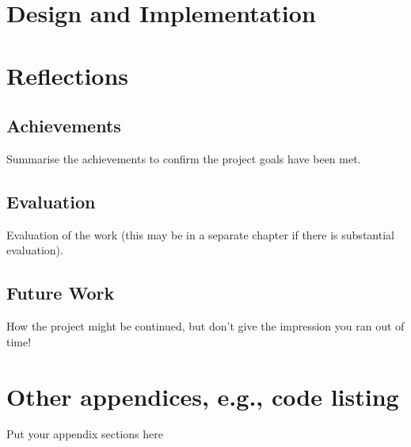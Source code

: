 \documentclass[a4paper]{report}
\begin{document}
\chapter{Design and Implementation}
\label{chapter:design-implementation}

\chapter{Reflections}
\label{chapter:reflections}

\section{Achievements}
Summarise the achievements to confirm the project goals have been met.

\section{Evaluation}
Evaluation of the work (this may be in a separate chapter if there is substantial evaluation).

\section{Future Work}
How the project might be continued, but don't give the impression you ran out of time!

\appendix

\printbibliography

\chapter{Other appendices, e.g., code listing}
Put your appendix sections here
\end{document}
